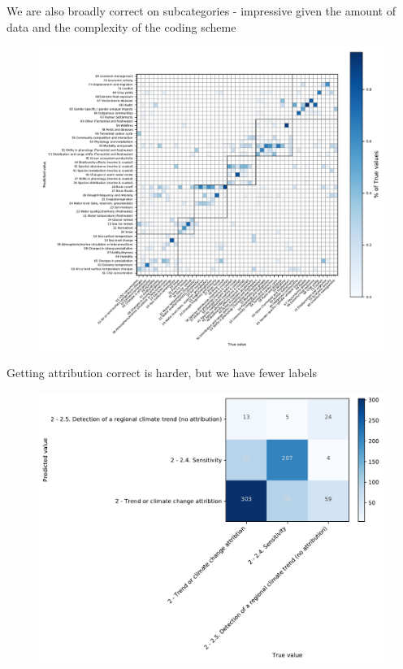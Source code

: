 \documentclass[9pt]{beamer}
\begin{document}
\begin{frame}{We are also broadly correct on subcategories - impressive given the amount of data and the complexity of the coding scheme}
	\begin{figure}
		
		\includegraphics[width=0.8\linewidth]{../plots/prediction_models/confusion_all_classes_pred.pdf}
	\end{figure}
\end{frame}

\begin{frame}{Getting attribution correct is harder, but we have fewer labels}
	\begin{figure}
	
	\includegraphics[width=0.8\linewidth]{../plots/prediction_models/confusion_attribution.pdf}
	\end{figure}
\end{frame}
\end{document}
